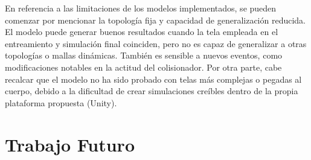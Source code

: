 En referencia a las limitaciones de los modelos implementados, se pueden comenzar por mencionar la topología fija y capacidad de generalización reducida. El modelo puede generar buenos resultados cuando la tela empleada en el entreamiento y simulación final coinciden, pero no es capaz de generalizar a otras topologías o mallas dinámicas. También es sensible a nuevos eventos, como modificaciones notables en la actitud del colisionador. Por otra parte, cabe recalcar que el modelo no ha sido probado con telas más complejas o pegadas al cuerpo, debido a la dificultad de crear simulaciones creíbles dentro de la propia plataforma propuesta (Unity). 


\section{Trabajo Futuro}

